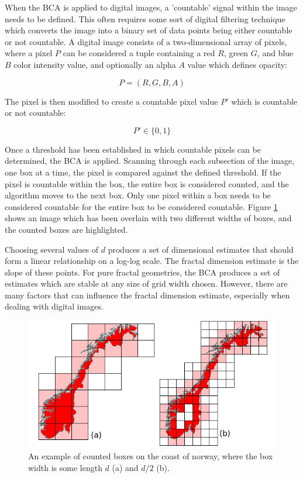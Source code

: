 \documentclass[12pt, oneside]{book}
\begin{document}
When the BCA is applied to digital images, a 'countable' signal within the image needs to be defined.  This often requires some sort of digital filtering technique which converts the image into a binary set of data points being either countable or not countable.  A digital image consists of a two-dimensional array of pixels, where a pixel \(P\) can be considered a tuple containing a red \(R\), green \(G\), and blue \(B\) color intensity value, and optionally an alpha \(A\) value which defines opacity:  

\begin{equation} \tag{7}
P = (R, G, B, A)
\end{equation}

The pixel is then modified to create a countable pixel value \(P'\) which is countable or not countable:

\begin{equation} \tag{8}
P' \in \{0, 1\} 
\end{equation}

Once a threshold has been established in which countable pixels can be determined, the BCA is applied.  Scanning through each subsection of the image, one box at a time, the pixel is compared against the defined threshold.  If the pixel is countable within the box, the entire box is considered counted, and the algorithm moves to the next box.  Only one pixel within a box needs to be considered countable for the entire box to be considered countable.  Figure \ref{fig:boxcount} shows an image which has been overlain with two different widths of boxes, and the counted boxes are highlighted. 

Choosing several values of \(d\) produces a set of dimensional estimates that should form a linear relationship on a log-log scale.  The fractal dimension estimate is the slope of these points.  For pure fractal geometries, the BCA produces a set of estimates which are stable at any size of grid width chosen. However, there are many factors that can influence the fractal dimension estimate, especially when dealing with digital images.

\begin{figure}[!b]
  \centering
  \includegraphics[width=\textwidth]{figures/boxcount_fig.png}
  \caption[An example of counted boxes on the coast of norway]{An example of counted boxes on the coast of norway, where the box width is some length \(d\) (a) and \(d/2\) (b).}
  \label{fig:boxcount}
\end{figure}
\end{document}
